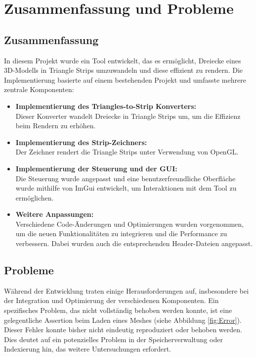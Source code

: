 \chapter{Zusammenfassung und Probleme}

\section{Zusammenfassung}
In diesem Projekt wurde ein Tool entwickelt, das es ermöglicht, Dreiecke eines
3D-Modells in Triangle Strips umzuwandeln und diese effizient zu rendern. Die
Implementierung basierte auf einem bestehenden Projekt und umfasste mehrere
zentrale Komponenten:

\begin{itemize}
    \item \textbf{Implementierung des Triangles-to-Strip Konverters:} \\
    Dieser Konverter wandelt Dreiecke in Triangle Strips um, um die Effizienz beim Rendern zu erhöhen.
    \\
    \item \textbf{Implementierung des Strip-Zeichners:} \\
    Der Zeichner rendert die Triangle Strips unter Verwendung von OpenGL.
    \\
    \item \textbf{Implementierung der Steuerung und der GUI:} \\
    Die Steuerung wurde angepasst und eine benutzerfreundliche Oberfläche wurde mithilfe von ImGui entwickelt, um Interaktionen mit dem Tool zu ermöglichen.
    \\
    \item \textbf{Weitere Anpassungen:} \\
    Verschiedene Code-Änderungen und Optimierungen wurden vorgenommen, um die neuen Funktionalitäten zu integrieren und die Performance zu verbessern. Dabei wurden auch die entsprechenden Header-Dateien angepasst.
\end{itemize}

\section{Probleme}
Während der Entwicklung traten einige Herausforderungen auf, insbesondere bei
der Integration und Optimierung der verschiedenen Komponenten. Ein spezifisches
Problem, das nicht vollständig behoben werden konnte, ist eine gelegentliche
Assertion beim Laden eines Meshes (siehe Abbildung \ref{fig:Error}). Dieser Fehler konnte bisher nicht
eindeutig reproduziert oder behoben werden. Dies deutet auf ein potenzielles
Problem in der Speicherverwaltung oder Indexierung hin, das weitere
Untersuchungen erfordert.


